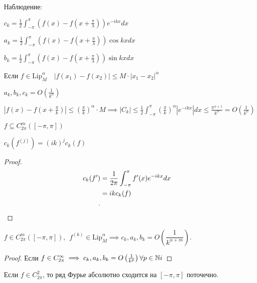 \begin{note}
    Наблюдение:

    $c_k = \frac{1}{2} \int_{-\pi}^{\pi} \left( f(x) - f(x+ \frac{\pi}{\lambda}) \right)e^{-ikx}dx $

    $a_k = \frac{1}{2} \int_{-\pi}^{\pi} \left( f(x) - f(x+ \frac{\pi}{\lambda}) \right)\cos kx dx $

    $b_k = \frac{1}{2} \int_{-\pi}^{\pi} \left( f(x) - f(x+ \frac{\pi}{\lambda}) \right)\sin kx dx $
\end{note}

\begin{note}
    Если $f\in \mathrm{Lip}_M^{\alpha}\quad \left| f(x_1) - f(x_2) \right| \leqslant M \cdot \left| x_1 - x_2 \right| ^{\alpha}$

    $a_k, b_k, c_k = O\left( \frac{1}{k^\alpha} \right) $

    $\left| f(x) - f(x + \frac{\pi}{k})\right| \leqslant \left( \frac{\pi}{k} \right)^\alpha \cdot M
    \implies |C_k| \leqslant \frac{1}{2} \int_{-\pi}^\pi \left( \frac{\pi}{k} \right)^\alpha |e^{-ikx}|dx
    \leqslant \frac{\pi^{\alpha + 1}}{k^\alpha} = O\left( \frac{1}{k^\alpha} \right) $
\end{note}

\begin{statement}
    $f\subseteq C_{2\pi}^{m}\left( \left[ -\pi, \pi \right]    \right) $

    $c_k(f^{(j)}) = (ik)^jc_k(f)$
\end{statement}
\begin{proof}
    \begin{align*}
        c_k(f^{\prime}) &= \frac{1}{2\pi} \int_{-\pi}^{\pi}f^{\prime}(x)e^{-ikx }dx \\
        &= ik c_k(f)  \\
    .\end{align*}
\end{proof}

\begin{corollary}
    $f\in C_{2\pi}^m \left( [-\pi, \pi] \right),~~ f^{(k)} \in
    \mathrm{Lip}_M^\alpha \implies c_k, a_k, b_k = O\left(\dfrac{1}{k^{\alpha + m}}\right)$.
\end{corollary}
\begin{proof}
    Если $f \in C_{2\pi}^{\infty } \implies c_k, a_k, b_k = O\left( \frac{1}{k^p} \right) \forall p\in \mathbb{N}  i$
\end{proof}

\begin{note}
    Если $f\in C_{2\pi}^2$, то ряд Фурье абсолютно сходится на $\left[ -\pi, \pi \right] $ поточечно.
\end{note}


